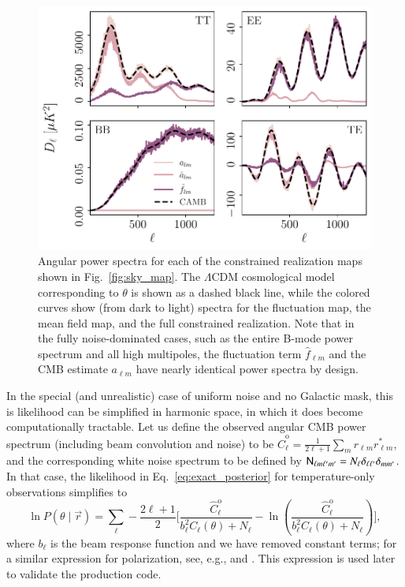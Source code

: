 \documentclass[twocolumn]{../common/aa}
\newcommand{\N}[0]{\tens{N}}
\renewcommand{\r}[0]{\vec{r}}
\begin{document}
\begin{figure}
	\centering
	\includegraphics[width=\linewidth]{figures/sigma_ell.pdf}
	\caption{\label{fig:sigma_ell}Angular power spectra for each of the constrained realization maps shown in Fig.~\ref{fig:sky_map}. The $\Lambda$CDM cosmological model corresponding to $\theta$ is shown as a dashed black line, while the colored curves show (from dark to light) spectra for the fluctuation map, the mean field map, and the full constrained realization. Note that in the fully noise-dominated cases, such as the entire B-mode power spectrum and all high multipoles, the fluctuation term $\hat f_{\ell m}$ and the CMB estimate $a_{\ell m}$ have nearly identical power spectra by design.}
\end{figure}

In the special (and unrealistic) case of uniform noise and no Galactic mask, this is likelihood can be simplified in harmonic space, in which it does become computationally tractable. Let us define the observed angular CMB power spectrum (including beam convolution and noise) to be $\hat{C}^{\mathrm{o}}_{\ell} = \frac{1}{2\ell+1}\sum_m r_{\ell m}r^*_{\ell m}$, and the corresponding white noise spectrum to be defined by $\N_{\ell m \ell'm'} = N_\ell \delta_{\ell \ell'}\delta_{mm'}$. In that case, the likelihood in Eq.~\eqref{eq:exact_posterior} for temperature-only observations simplifies to
{\small
\begin{equation}
  \ln P(\theta \mid \r) = \sum_{\ell} -\frac{2\ell+1}{2} \bigg[\frac{\hat{C}^{\mathrm{o}}_{\ell}}{b_\ell^2 C_{\ell}(\theta) + N_\ell}-\ln \left(\frac{\hat{C}^{\mathrm{o}}_{\ell}}{b_\ell^2 C_{\ell}(\theta) + N_\ell} \right) \bigg],
  \label{eq:exact_harm}
\end{equation}}
where $b_\ell$ is the beam response function and we have removed constant terms; for a similar expression for polarization, see, e.g., \citet{larson:2006} and \citet{Hamimeche:2008ai}. This expression is used later to validate the production code.
\end{document}
